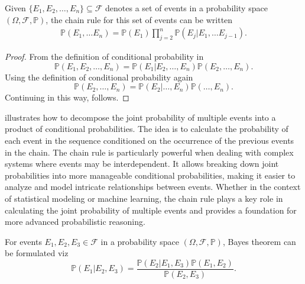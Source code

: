 \begin{theorem}
	\label{theorem:chain_rule}
	Given $\{E_1, E_2, \ldots, E_n\}\subseteq \mathcal{F}$ denotes a set of events in a probability space $(\Omega, \mathcal{F}, \mathbb{P})$, the chain rule for this set of events can be written
	\begin{equation}
		\begin{split}
			\mathbb{P}(E_1, \dots E_n) = \mathbb{P}(E_1)\prod_{j=2}^{n}\mathbb{P}(E_j|E_1,\dots E_{j-1}).
		\end{split}
		\label{eq:prod}
	\end{equation}
\end{theorem}
\begin{proof}
	From the definition of conditional probability in 
	\begin{equation}
		\mathbb{P}(E_1, E_2, \ldots, E_n) = \mathbb{P}(E_1|E_2, \dots, E_n)\mathbb{P}(E_2, \dots, E_n).
		\label{eq:p1}
	\end{equation}
	Using the definition of conditional probability again
	\begin{equation}
		\mathbb{P}(E_2, \ldots, E_n) = \mathbb{P}(E_2| \ldots, E_n)\mathbb{P}(\dots, E_n).
	\end{equation}
	Continuing in this way,  follows.
\end{proof}
\begin{remark}
	 illustrates how to decompose the joint probability of multiple events into a product of conditional probabilities. The idea is to calculate the probability of each event in the sequence conditioned on the occurrence of the previous events in the chain. The chain rule is particularly powerful when dealing with complex systems where events may be interdependent. It allows breaking down joint probabilities into more manageable conditional probabilities, making it easier to analyze and model intricate relationships between events. Whether in the context of statistical modeling or machine learning, the chain rule plays a key role in calculating the joint probability of multiple events and provides a foundation for more advanced probabilistic reasoning.
\end{remark}

\begin{theorem}
	\label{theorem:bayes_theorem}
	For events $E_1,E_2,E_3 \in \mathcal{F}$ in a probability space $(\Omega, \mathcal{F}, \mathbb{P})$, Bayes theorem can be formulated viz
	\begin{equation}
		\mathbb{P}(E_1| E_2,E_3) = \frac{\mathbb{P}(E_2| E_1,E_3)\mathbb{P}(E_1,E_2)}{\mathbb{P}(E_2,E_3)}.
		\label{bayes_theorem}
	\end{equation}
\end{theorem}

